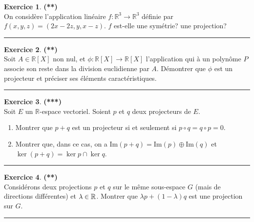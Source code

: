 \documentclass[a4paper,11pt]{article}
\theoremstyle{definition}
\newtheorem{exo}{Exercice} %
\begin{document}
    
\begin{minipage}{1\linewidth}\begin{minipage}[t]{0.48\linewidth}\raggedright

\begin{exo}\textbf{(**)}\quad\\[0.2cm]		
On considère l'application linéaire $f:\mathbb R^3\to\mathbb R^3$ définie par $f(x,y,z)=(2x-2z,y,x-z)$. $f$ est-elle une symétrie? une projection? 

\centering\rule{1\linewidth}{0.6pt}\end{exo}

\begin{exo}\textbf{(**)}\quad\\[0.2cm]
	Soit $A\in\mathbb R[X]$ non nul, et $\phi:\mathbb R[X]\to\mathbb R[X]$ l'application qui à un polynôme $P$ associe son reste dans la division euclidienne par $A$. Démontrer que $\phi$ est un projecteur et préciser ses éléments caractéristiques.
	
\centering\rule{1\linewidth}{0.6pt}\end{exo}


\begin{exo}\textbf{(***)}\quad\\[0.2cm]
	Soit $E$ un $\mathbb R$-espace vectoriel. Soient $p$ et $q$ deux projecteurs de $E$.
	\begin{enumerate}
		\item Montrer que $p+q$ est un projecteur si et seulement si $p\circ q=q\circ p=0$.
		\item Montrer que, dans ce cas, on a $\textrm{Im}(p+q)=\textrm{Im}(p)\oplus \textrm{Im}(q)$
		et $\ker(p+q)=\ker p\cap \ker q$.
	\end{enumerate}
	
	\centering\rule{1\linewidth}{0.6pt}\end{exo}


\begin{exo}\textbf{(**)}\quad\\[0.2cm]
	Considérons deux projections $p$ et $q$ sur le même sous-espace $G$ (mais de directions différentes) et $\lambda\in \mathbb{R}$.
	Montrer que $\lambda p + (1 - \lambda)q$ est une projection sur $G$.
	
	\centering\rule{1\linewidth}{0.6pt}\end{exo}


\end{minipage}\hfill\vrule\hfill\begin{minipage}[t]{0.48\linewidth}\raggedright



\end{minipage}
\end{minipage}
\end{document}
